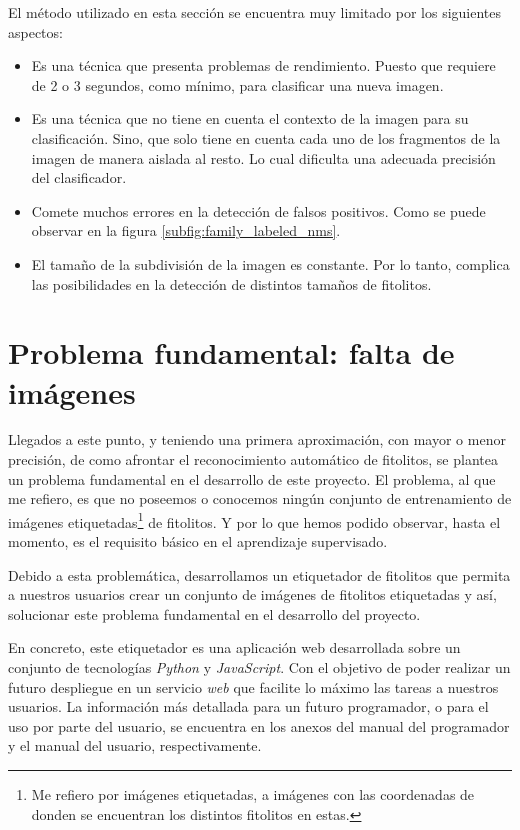 El método utilizado en esta sección se encuentra muy limitado por los siguientes aspectos:

\begin{itemize}
	\item Es una técnica que presenta problemas de rendimiento. Puesto que requiere de 2 o 3 segundos, como mínimo, para clasificar una nueva imagen.
	\item Es una técnica que no tiene en cuenta el contexto de la imagen para su clasificación. Sino, que solo tiene en cuenta cada uno de los fragmentos de la imagen de manera aislada al resto. Lo cual dificulta una adecuada precisión del clasificador.
	\item Comete muchos errores en la detección de falsos positivos. Como se puede observar en la figura \ref{subfig:family_labeled_nms}.
	\item El tamaño de la subdivisión de la imagen es constante. Por lo tanto, complica las posibilidades en la detección de distintos tamaños de fitolitos.
\end{itemize}

\section{Problema fundamental: falta de imágenes}

Llegados a este punto, y teniendo una primera aproximación, con mayor o menor precisión, de como afrontar el reconocimiento automático de fitolitos, se plantea un problema fundamental en el desarrollo de este proyecto. El problema, al que me refiero, es que no poseemos o conocemos ningún conjunto de entrenamiento de imágenes etiquetadas\footnote{Me refiero por imágenes etiquetadas, a imágenes con las coordenadas de donden se encuentran los distintos fitolitos en estas.} de fitolitos. Y por lo que hemos podido observar, hasta el momento, es el requisito básico en el aprendizaje supervisado.

Debido a esta problemática, desarrollamos un etiquetador de fitolitos que permita a nuestros usuarios crear un conjunto de imágenes de fitolitos etiquetadas y así, solucionar este problema fundamental en el desarrollo del proyecto.

En concreto, este etiquetador es una aplicación web desarrollada sobre un conjunto de tecnologías \textit{Python} y \textit{JavaScript}. Con el objetivo de poder realizar un futuro despliegue en un servicio \textit{web} que facilite lo máximo las tareas a nuestros usuarios. La información más detallada para un futuro programador, o para el uso por parte del usuario, se encuentra en los anexos del manual del programador y el manual del usuario, respectivamente.

